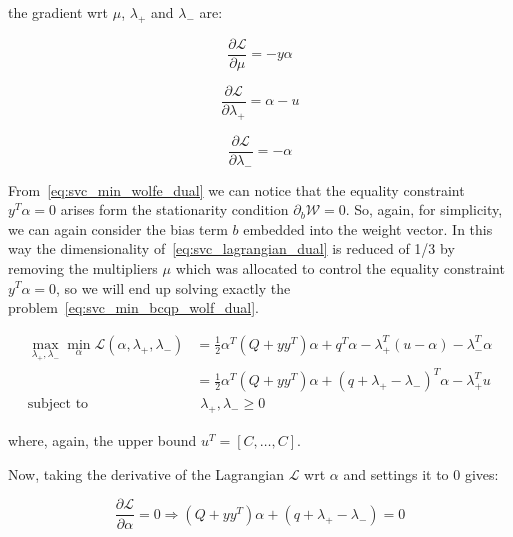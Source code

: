 the gradient wrt $\mu$, $\lambda_+$ and $\lambda_-$ are:

\begin{equation} \label{eq:svc_lagrangian_der_mu}
	\frac{\partial \mathcal{L}}{\partial \mu}=-y \alpha
\end{equation}

\begin{equation} \label{eq:svc_lagrangian_der_lp}
	\frac{\partial \mathcal{L}}{\partial \lambda_+}=\alpha - u
\end{equation}

\begin{equation} \label{eq:svc_lagrangian_der_lm}
    \frac{\partial \mathcal{L}}{\partial \lambda_-}=-\alpha
\end{equation}

From~\eqref{eq:svc_min_wolfe_dual} we can notice that the equality constraint $y^T \alpha = 0$ arises form the stationarity condition $\partial_{{b}} \mathcal{W}=0$. So, again, for simplicity, we can again consider the bias term $b$ embedded into the weight vector. In this way the dimensionality of~\eqref{eq:svc_lagrangian_dual} is reduced of 1/3 by removing the multipliers $\mu$ which was allocated to control the equality constraint $y^T \alpha=0$, so we will end up solving exactly the problem~\eqref{eq:svc_min_bcqp_wolf_dual}.

\begin{equation} \label{eq:l1_svc_bcqp_lagrangian_dual}
	\begin{aligned}
    	\max_{\lambda_+,\lambda_-} \min_{\alpha} \mathcal{L}(\alpha,\lambda_+,\lambda_-) &= \frac{1}{2} \alpha^T (Q + yy^T)\alpha+q^T\alpha - \lambda_+^T (u - \alpha) - \lambda_-^T \alpha \\
    &= \frac{1}{2} \alpha^T (Q + yy^T)\alpha + (q + \lambda_+ - \lambda_-)^T \alpha - \lambda_+^T u \\
    \text{subject to} \quad & \,\, \lambda_+, \lambda_- \geq 0
	\end{aligned}
\end{equation}

where, again, the upper bound $u^T = [C, \dots, C]$.

Now, taking the derivative of the Lagrangian $\mathcal{L}$ wrt $\alpha$ and settings it to 0 gives:

\begin{equation} \label{eq:l1_svc_bcqp_lagrangian_der_a}
	\frac{\partial \mathcal{L}}{\partial \alpha}=0\Rightarrow (Q + yy^T) \alpha + (q + \lambda_+ - \lambda_-) = 0
\end{equation}

